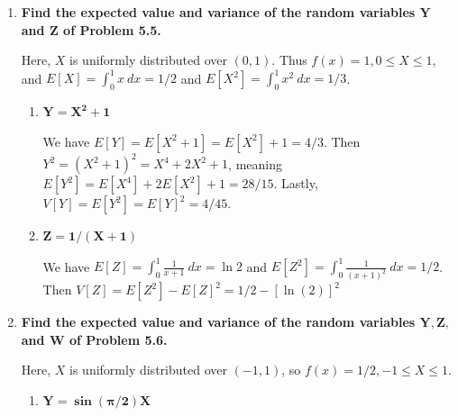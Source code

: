 \documentclass[10pt, oneside]{article}
\begin{document}
\begin{enumerate}[label=7.\arabic*]
  Here, $X$ has pdf $f(x) = e^{-x}, x > 0$, and $Y = X^3$. By LOTUS, $E[Y] = \int^{+\infty}_0 x^3 e^{-x} \ dx = \boxed{6}$. Moreover, $E[Y^2] = \int^{+\infty}_0 x^6 e^{-x} \ dx = 720$. Then $V[Y] = E[Y^2] - E[Y]^2 = \boxed{684}$.
  
\item  \begin{tcolorbox}[
  colback=Cerulean!5!white,
  colframe=Cerulean!75!black]
  \textbf{Find the expected value and variance of the random variables $\bm{Y}$ and $\bm{Z}$ of Problem 5.5.}
  \end{tcolorbox}
  
  Here, $X$ is uniformly distributed over $(0,1)$. Thus $f(x) = 1, 0 \leq X \leq 1$, and $E[X] = \int^1_0 x \ dx = 1/2$ and $E[X^2] = \int^1_0 x^2 \ dx = 1/3$.
  
  	\begin{enumerate}
	\item  \begin{tcolorbox}[
	  colback=Cerulean!5!white,
	  colframe=Cerulean!75!black]
	\textbf{$\bm{Y = X^2 + 1}$}
	\end{tcolorbox}
	
	We have $E[Y] = E[X^2 + 1] = E[X^2] + 1 = \boxed{4/3}$. Then $Y^2 = (X^2 + 1)^2 = X^4 + 2X^2 + 1$, meaning $E[Y^2] = E[X^4] + 2 E[X^2] + 1 = 28/15$. Lastly, $V[Y] = E[Y^2] = E[Y]^2 = \boxed{4/45}$.
	
	\item  \begin{tcolorbox}[
	  colback=Cerulean!5!white,
	  colframe=Cerulean!75!black]
	\textbf{$\bm{Z = 1/(X + 1)}$}
	\end{tcolorbox}	
	
	We have $E[Z] = \int^1_0 \frac{1}{x + 1} \ dx = \boxed{\ln 2}$ and $E[Z^2] = \int^1_0 \frac{1}{(x + 1)^2} \ dx = 1/2$. Then $V[Z] = E[Z^2] - E[Z]^2 = \boxed{1/2 - [\ln(2)]^2}$
	\end{enumerate}
	
\item  \begin{tcolorbox}[
  colback=Cerulean!5!white,
  colframe=Cerulean!75!black]
  \textbf{Find the expected value and variance of the random variables $\bm{Y, Z,}$ and $\bm{W}$ of Problem 5.6.}
  \end{tcolorbox}
  
  Here, $X$ is uniformly distributed over $(-1,1)$, so $f(x) = 1/2, -1 \leq X \leq 1$.
  
  	\begin{enumerate}
	\item  \begin{tcolorbox}[
	  colback=Cerulean!5!white,
	  colframe=Cerulean!75!black]
	\textbf{$\bm{Y = \sin (\pi / 2) X}$}
	\end{tcolorbox}
	

\end{enumerate}
\end{enumerate}
\end{document}

